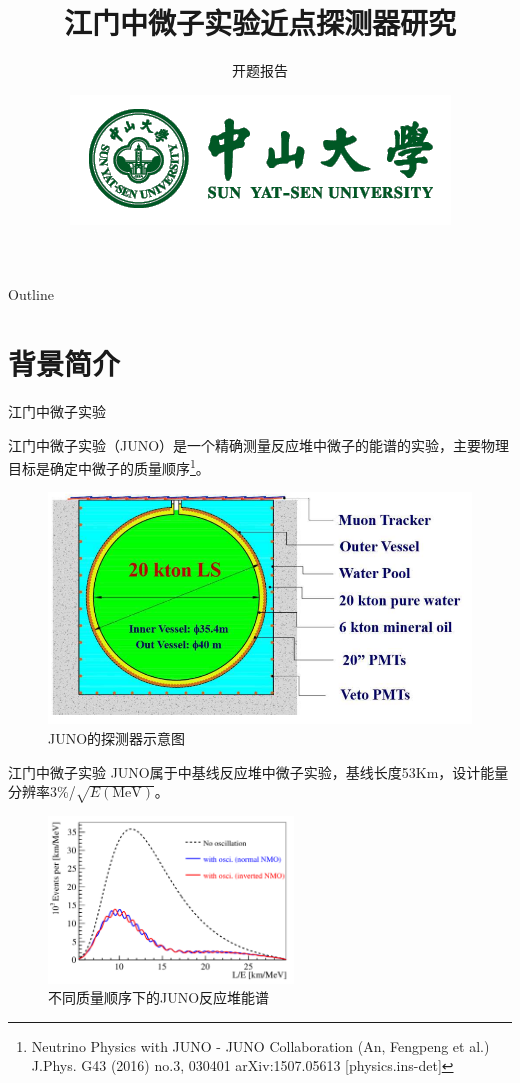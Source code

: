 \documentclass[11pt,compress,xcolor=x11names,UTF8]{beamer}
\title{江门中微子实验近点探测器研究}
\subtitle{开题报告}
\author[赵荣]{Email：zhaor25@mail2.sysu.edu.cn \and  } %
\institute[中山大学]{School of Physics\and } %
\date[\today]{\includegraphics[width=.5\textwidth]{logo}}
\begin{document}
\maketitle

\begin{frame}{Outline}
\tableofcontents
\end{frame}

\section{背景简介}


\begin{frame}{江门中微子实验}

江门中微子实验（JUNO）是一个精确测量反应堆中微子的能谱的实验，主要物理目标是确定中微子的质量顺序\footnote{Neutrino Physics with JUNO - JUNO Collaboration (An, Fengpeng et al.) J.Phys. G43 (2016) no.3, 030401 arXiv:1507.05613 [physics.ins-det] }。
\begin{figure}
\centering
\includegraphics[width=.6\textwidth]{k_junodet} %
\caption{JUNO的探测器示意图}
\end{figure}
\end{frame}
\begin{frame}{江门中微子实验}
JUNO属于中基线反应堆中微子实验，基线长度53Km，设计能量分辨率3\%/$\sqrt{E(\text{MeV})}$。
\begin{figure}
\centering
\includegraphics[width=0.58\textwidth]{k_nuosi} %
\caption{不同质量顺序下的JUNO反应堆能谱}
\end{figure}
\end{frame}
\end{document}
